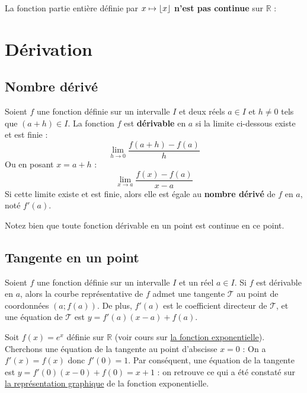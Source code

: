 	La fonction partie entière définie par $x \mapsto \lfloor x \rfloor$ \textbf{n'est pas continue} sur $\mathbb{R}$ :
	
	
	\section{Dérivation}
	
	\subsection{Nombre dérivé}
	
	\begin{formula}[Définition]
		Soient $f$ une fonction définie sur un intervalle $I$ et deux réels $a \in I$ et $h \neq 0$ tels que $(a + h) \in I$. La fonction $f$ est \textbf{dérivable} en $a$ si la limite ci-dessous existe et est finie :
		\[ \lim\limits_{h \rightarrow 0} \frac{f(a + h) - f(a)}{h} \]
		Ou en posant $x = a + h$ :
		\[ \lim\limits_{x \rightarrow a} \frac{f(x) - f(a)}{x-a} \]
		Si cette limite existe et est finie, alors elle est égale au \textbf{nombre dérivé} de $f$ en $a$, noté $f'(a)$.
	\end{formula}
	
	\begin{tip}[Remarque]
		Notez bien que toute fonction dérivable en un point est continue en ce point.
	\end{tip}
	
	\subsection{Tangente en un point}
	
	\begin{formula}
		Soient $f$ une fonction définie sur un intervalle $I$ et un réel $a \in I$. Si $f$ est dérivable en $a$, alors la courbe représentative de $f$ admet une tangente $\mathcal{T}$ au point de coordonnées $(a; f(a))$.
		\newpar
		De plus, $f'(a)$ est le coefficient directeur de $\mathcal{T}$, et une équation de $\mathcal{T}$ est $y = f'(a)(x-a)+f(a)$.
	\end{formula}
	
	\begin{tip}[Exemple]
		Soit $f(x) = e^x$ définie sur $\mathbb{R}$ (voir cours sur \href{https://bacomathiqu.es/cours/premiere/fonction-exponentielle/}{la fonction exponentielle}).
		\newpar
		Cherchons une équation de la tangente au point d'abscisse $x = 0$ :
		\newpar
		On a $f'(x) = f(x)$ donc $f'(0) = 1$.
		\newpar
		Par conséquent, une équation de la tangente est $y = f'(0)(x-0)+f(0) = x + 1$ :
		on retrouve ce qui a été constaté sur \href{https://bacomathiqu.es/cours/premiere/fonction-exponentielle/#3-représentation-graphique}{la représentation graphique} de la fonction exponentielle.
	\end{tip}
	

